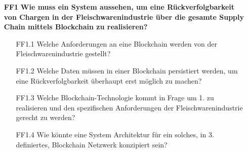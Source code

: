 \begin{itemize}
  \item[\textbf{FF1}] \textbf{Wie muss ein System aussehen, um eine Rückverfolgbarkeit von Chargen in der Fleischwarenindustrie über die gesamte Supply Chain mittels Blockchain zu realisieren?}
  \begin{itemize}
    \item[FF1.1] Welche Anforderungen an eine Blockchain werden von der Fleischwarenindustrie gestellt?
    \item[FF1.2] Welche Daten müssen in einer Blockchain persistiert werden, um eine Rückverfolgbarkeit überhaupt erst möglich zu machen?
    \item[FF1.3] Welche Blockchain-Technologie kommt in Frage um 1. zu realisieren und den spezifischen Anforderungen der Fleischwarenindustrie gerecht zu werden?
    \item[FF1.4] Wie könnte eine System Architektur für ein solches, in 3. definiertes, Blockchain Netzwerk konzipiert sein?
  \end{itemize}
\end{itemize}


\newpage
